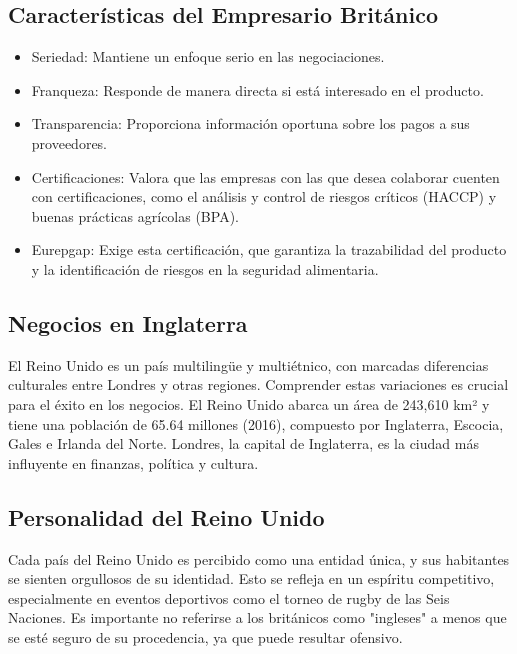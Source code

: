 \documentclass[letterpaper, 12pt]{article}
\begin{document}
\subsection*{Características del Empresario Británico}

\begin{itemize}[label=$\bullet$]
      \item Seriedad: Mantiene un enfoque serio en las negociaciones.
      \item Franqueza: Responde de manera directa si está interesado en el producto.
      \item Transparencia: Proporciona información oportuna sobre los pagos a sus
            proveedores.
      \item Certificaciones: Valora que las empresas con las que desea colaborar cuenten
            con certificaciones, como el análisis y control de riesgos críticos (HACCP) y
            buenas prácticas agrícolas (BPA).
      \item Eurepgap: Exige esta certificación, que garantiza la trazabilidad del producto
            y la identificación de riesgos en la seguridad alimentaria.
\end{itemize}

\subsection*{Negocios en Inglaterra}

El Reino Unido es un país multilingüe y multiétnico, con marcadas diferencias
culturales entre Londres y otras regiones. Comprender estas variaciones es
crucial para el éxito en los negocios. El Reino Unido abarca un área de 243,610
km² y tiene una población de 65.64 millones (2016), compuesto por Inglaterra,
Escocia, Gales e Irlanda del Norte. Londres, la capital de Inglaterra, es la
ciudad más influyente en finanzas, política y cultura.

\subsection*{Personalidad del Reino Unido}

Cada país del Reino Unido es percibido como una entidad única, y sus habitantes
se sienten orgullosos de su identidad. Esto se refleja en un espíritu
competitivo, especialmente en eventos deportivos como el torneo de rugby de las
Seis Naciones. Es importante no referirse a los británicos como "ingleses" a
menos que se esté seguro de su procedencia, ya que puede resultar ofensivo.
\end{document}
